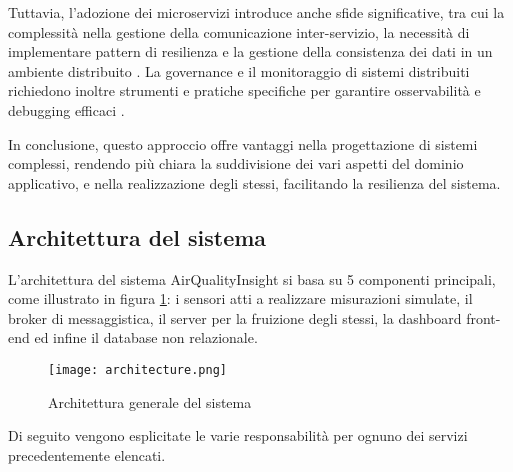 Tuttavia, l'adozione dei microservizi introduce anche sfide significative, tra cui la complessità nella gestione
della comunicazione inter-servizio, la necessità di implementare pattern di resilienza e la gestione della consistenza
dei dati in un ambiente distribuito \cite{richardson2018microservices}. La governance e il monitoraggio
di sistemi distribuiti richiedono inoltre strumenti e pratiche specifiche
per garantire osservabilità e debugging efficaci \cite{wolff2016microservices}.

In conclusione, questo approccio offre vantaggi nella progettazione di sistemi complessi, rendendo più chiara
la suddivisione dei vari aspetti del dominio applicativo, e nella realizzazione degli stessi,
facilitando la resilienza del sistema.

\subsection{Architettura del sistema}

L'architettura del sistema AirQualityInsight si basa su 5 componenti principali, come illustrato
in figura \ref{fig:architecture}: i sensori atti a realizzare misurazioni simulate, il broker di messaggistica,
il server per la fruizione degli stessi, la dashboard front-end ed infine il database non relazionale.

\begin{figure}[H]
  \centering
  \texttt{[image: architecture.png]}
  \caption{Architettura generale del sistema}
  \label{fig:architecture}
\end{figure}

Di seguito vengono esplicitate le varie responsabilità per ognuno dei servizi precedentemente elencati.

